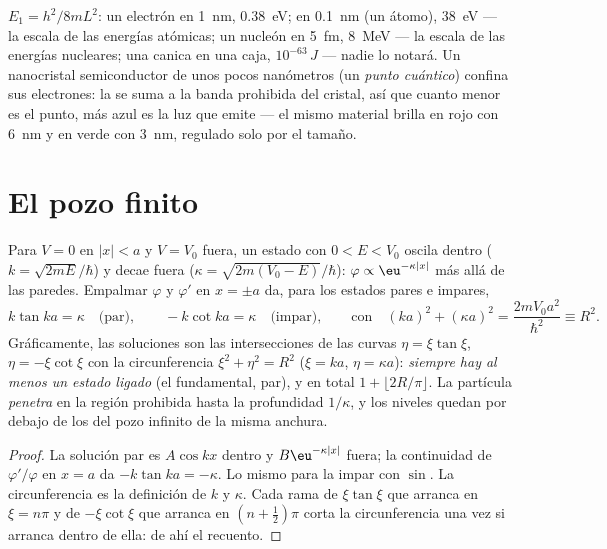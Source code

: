 \begin{example}\label{ex:b2:potential-wells-tunneling:orders}
$E_1 = h^2/8mL^2$: un electrón en \qty{1}{nm}, \qty{0.38}{eV}; en
\qty{0.1}{nm} (un átomo), \qty{38}{eV} --- la escala de las energías atómicas; un
nucleón en \qty{5}{fm}, \qty{8}{MeV} --- la escala de las energías nucleares; una
canica en una caja, $10^{-63}\,\unit{J}$ --- nadie lo notará. Un
nanocristal semiconductor de unos pocos nanómetros (un \emph{punto
cuántico}) confina sus electrones: la  se suma a la
banda prohibida del cristal, así que cuanto menor es el punto, más azul es la luz que emite ---
el mismo material brilla en rojo con \qty{6}{nm} y en verde con \qty{3}{nm},
regulado solo por el tamaño.
\end{example}

\section{El pozo finito}

\begin{proposition}\label{prop:b2:potential-wells-tunneling:finite}
Para $V = 0$ en $|x| < a$ y $V = V_0$ fuera, un estado con $0 < E < V_0$
oscila dentro ($k = \sqrt{2mE}/\hbar$) y decae fuera ($\kappa =
\sqrt{2m(V_0 - E)}/\hbar$): $\varphi \propto \eu^{-\kappa|x|}$ más allá de las paredes.
Empalmar $\varphi$ y $\varphi'$ en $x = \pm a$ da, para los estados pares e
impares,
\[
k\tan ka = \kappa \quad\text{(par)}, \qquad
-k\cot ka = \kappa \quad\text{(impar)}, \qquad\text{con}\quad
(ka)^2 + (\kappa a)^2 = \frac{2mV_0a^2}{\hbar^2} \equiv R^2 .
\]
Gráficamente, las soluciones son las intersecciones de las curvas $\eta =
\xi\tan\xi$, $\eta = -\xi\cot\xi$ con la circunferencia $\xi^2 + \eta^2 = R^2$
($\xi = ka$, $\eta = \kappa a$): \emph{siempre hay al menos un estado
ligado} (el fundamental, par), y en total $1 + \lfloor 2R/\pi\rfloor$.
La partícula \emph{penetra} en la región prohibida hasta la profundidad
$1/\kappa$, y los niveles quedan por debajo de los del pozo infinito de la
misma anchura.
\end{proposition}

\begin{proof}
La solución par es $A\cos kx$ dentro y $B\eu^{-\kappa|x|}$ fuera; la
continuidad de $\varphi'/\varphi$ en $x = a$ da $-k\tan ka = -\kappa$. Lo mismo
para la impar con $\sin$. La circunferencia es la definición de $k$ y
$\kappa$. Cada rama de $\xi\tan\xi$ que arranca en $\xi = n\pi$ y de
$-\xi\cot\xi$ que arranca en $(n + \tfrac12)\pi$ corta la circunferencia una vez si
arranca dentro de ella: de ahí el recuento.
\end{proof}

